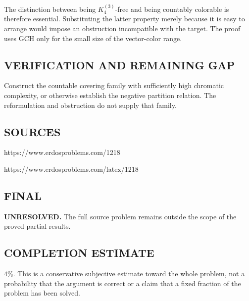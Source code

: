 The distinction between being $K_4^{(3)}$-free and being countably colorable is
therefore essential. Substituting the latter property merely because it is
easy to arrange would impose an obstruction incompatible with the target.
The proof uses GCH only for the small size of the vector-color range.

\subsection*{VERIFICATION AND REMAINING GAP}
Construct the countable covering family with sufficiently high chromatic
complexity, or otherwise establish the negative partition relation. The
reformulation and obstruction do not supply that family.

\subsection*{SOURCES}
https://www.erdosproblems.com/1218

https://www.erdosproblems.com/latex/1218

\subsection*{FINAL}
\textbf{UNRESOLVED.} The full source problem remains outside the scope of the proved partial results.

\subsection*{COMPLETION ESTIMATE}
$4\%$. This is a conservative subjective estimate toward the whole problem, not a probability that the argument is correct or a claim that a fixed fraction of the problem has been solved.
